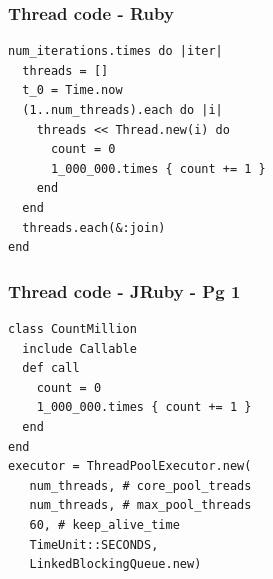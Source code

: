 \begin{frame}[fragile]\frametitle{Thread code - Ruby}
\begin{lstlisting}
num_iterations.times do |iter|
  threads = []
  t_0 = Time.now
  (1..num_threads).each do |i|
    threads << Thread.new(i) do
      count = 0
      1_000_000.times { count += 1 }
    end
  end
  threads.each(&:join)
end
\end{lstlisting}
\end{frame}
\begin{frame}[fragile]\frametitle{Thread code - JRuby - Pg 1}
\begin{lstlisting}
class CountMillion
  include Callable
  def call
    count = 0
    1_000_000.times { count += 1 }
  end
end
executor = ThreadPoolExecutor.new(
   num_threads, # core_pool_treads
   num_threads, # max_pool_threads
   60, # keep_alive_time
   TimeUnit::SECONDS,
   LinkedBlockingQueue.new)
\end{lstlisting}
\end{frame}

